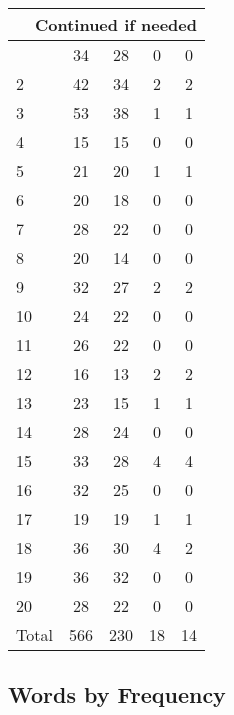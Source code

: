 \begin{center}
\begin{longtable}{l|c|c|c|c}
\hline \multicolumn{5}{|r|}{{Continued if needed}} \\ \hline
\endfoot 
1 & 34 & 28 & 0 & 0\\ \hline
2 & 42 & 34 & 2 & 2\\ \hline
3 & 53 & 38 & 1 & 1\\ \hline
4 & 15 & 15 & 0 & 0\\ \hline
5 & 21 & 20 & 1 & 1\\ \hline
6 & 20 & 18 & 0 & 0\\ \hline
7 & 28 & 22 & 0 & 0\\ \hline
8 & 20 & 14 & 0 & 0\\ \hline
9 & 32 & 27 & 2 & 2\\ \hline
10 & 24 & 22 & 0 & 0\\ \hline
11 & 26 & 22 & 0 & 0\\ \hline
12 & 16 & 13 & 2 & 2\\ \hline
13 & 23 & 15 & 1 & 1\\ \hline
14 & 28 & 24 & 0 & 0\\ \hline
15 & 33 & 28 & 4 & 4\\ \hline
16 & 32 & 25 & 0 & 0\\ \hline
17 & 19 & 19 & 1 & 1\\ \hline
18 & 36 & 30 & 4 & 2\\ \hline
19 & 36 & 32 & 0 & 0\\ \hline
20 & 28 & 22 & 0 & 0\\ \hline
\hline \hline
Total & 566 & 230 & 18 & 14



\end{longtable}
\end{center}

 
\subsection{Words by Frequency}

